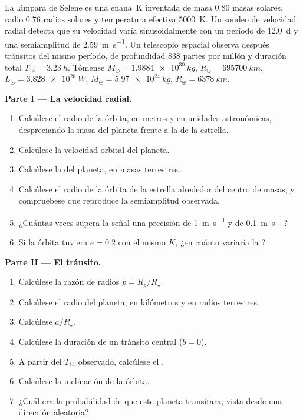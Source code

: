 \begin{problem}
\label{pb:b3:exoplanets:1}
La lámpara de Selene es una enana~K inventada de masa 0.80 masas solares, radio
0.76 radios solares y temperatura efectiva \qty{5000}{K}. Un
sondeo de velocidad radial detecta que su velocidad varía sinusoidalmente con
un período de \qty{12.0}{d} y una semiamplitud de \qty{2.59}{m.s^{-1}}. Un
telescopio espacial observa después tránsitos del mismo período, de profundidad
\num{838} partes por millón y duración total $T_{14} = \qty{3.23}{h}$.
Tómense $M_\odot = \qty{1.9884e30}{kg}$, $R_\odot = \qty{695700}{km}$,
$L_\odot = \qty{3.828e26}{W}$, $M_\oplus = \qty{5.97e24}{kg}$,
$R_\oplus = \qty{6378}{km}$.

\medskip\noindent\textbf{Parte I --- La velocidad radial.}
\begin{enumerate}
\item Calcúlese el radio de la órbita, en metros y en
  unidades astronómicas, despreciando la masa del planeta frente a la de la estrella.
\item Calcúlese la velocidad orbital del planeta.
\item Calcúlese la  del planeta, en masas terrestres.
\item Calcúlese el radio de la órbita de la estrella alrededor del centro de
  masas, y compruébese que reproduce la semiamplitud observada.
\item ¿Cuántas veces supera la señal una precisión de
  \qty{1}{m.s^{-1}} y de \qty{0.1}{m.s^{-1}}?
\item Si la órbita tuviera $e = 0.2$ con el mismo $K$, ¿en cuánto variaría la
  ?
\end{enumerate}

\medskip\noindent\textbf{Parte II --- El tránsito.}
\begin{enumerate}[resume]
\item Calcúlese la razón de radios $p = R_p/R_\star$.
\item Calcúlese el radio del planeta, en kilómetros y en radios terrestres.
\item Calcúlese $a/R_\star$.
\item Calcúlese la duración de un tránsito central ($b = 0$).
\item A partir del $T_{14}$ observado, calcúlese el .
\item Calcúlese la inclinación de la órbita.
\item ¿Cuál era la probabilidad de que este planeta transitara, vista desde una
  dirección aleatoria?
\end{enumerate}


\end{problem}
